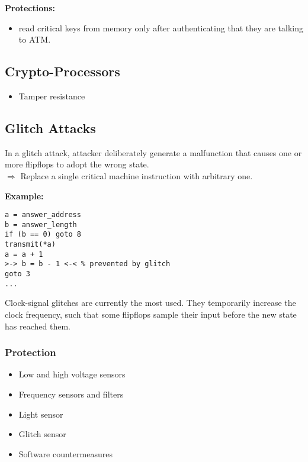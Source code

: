 \textbf{Protections:}
\begin{itemize}
  \item read critical keys from memory only after authenticating
    that they are talking to ATM.
\end{itemize}

\subsection{Crypto-Processors}
\begin{itemize}
  \item Tamper resistance
\end{itemize}

\subsection{Glitch Attacks}
In a glitch attack, attacker deliberately generate a malfunction that
causes one or more flipflops to adopt the wrong state.\\
$\Rightarrow$ Replace a single critical machine instruction with arbitrary one.

\textbf{Example:}
\begin{lstlisting}
a = answer_address
b = answer_length
if (b == 0) goto 8
transmit(*a)
a = a + 1
>-> b = b - 1 <-< % prevented by glitch
goto 3
...
\end{lstlisting}
Clock-signal glitches are currently the most used. They temporarily increase
the clock frequency, such that some flipflops sample their input before the new
state has reached them.

\subsubsection{Protection}
\begin{itemize}
	\item  Low and high voltage sensors
	\item Frequency sensors and filters
	\item Light sensor
	\item Glitch sensor
	\item Software countermeasures
\end{itemize}


